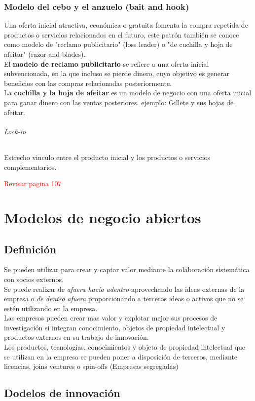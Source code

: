 \documentclass[11pt]{book}
\begin{document}
\subsection{Modelo del cebo y el anzuelo (bait and hook)}
Una oferta inicial atractiva, económica o gratuita fomenta la compra repetida de productos o servicios relacionados en el futuro, este patrón también se conoce como modelo de "reclamo publicitario" (loss leader) o "de cuchilla y hoja de afeitar" (razor and blades).\\
El \textbf{modelo de reclamo publicitario} se refiere a una oferta inicial subvencionada, en la que incluso se pierde dinero, cuyo objetivo es generar beneficios con las compras relacionadas posteriormente.\\
La \textbf{cuchilla y la hoja de afeitar} es un modelo de negocio con una oferta inicial para ganar dinero con las ventas posteriores. ejemplo: Gillete y sus hojas de afeitar.
\subparagraph{Lock-in}
Estrecho vinculo entre el producto inicial y los productos o servicios complementarios.
\begin{flushright}
\textcolor{red}{Revisar pagina 107}
\end{flushright} 
\chapter{Modelos de negocio abiertos}
\section{Definición}
Se pueden utilizar para crear y captar valor mediante la colaboración sistemática con socios externos.\\
Se puede realizar de \textit{afuera hacia adentro} aprovechando las ideas externas de la empresa o \textit{de dentro afuera} proporcionando a terceros ideas o activos que no se estén utilizando en la empresa.\\
Las empresas pueden crear mas valor y explotar mejor sus procesos de investigación si integran conocimiento, objetos de propiedad intelectual y productos externos en su trabajo de innovación. \\
Los productos, tecnologías, conocimientos y objeto de propiedad intelectual que se utilizan en la empresa se pueden poner a disposición de terceros, mediante licencias, joins ventures o spin-offs (Empresas segregadas)
\section{Dodelos de innovación}
\end{document}
